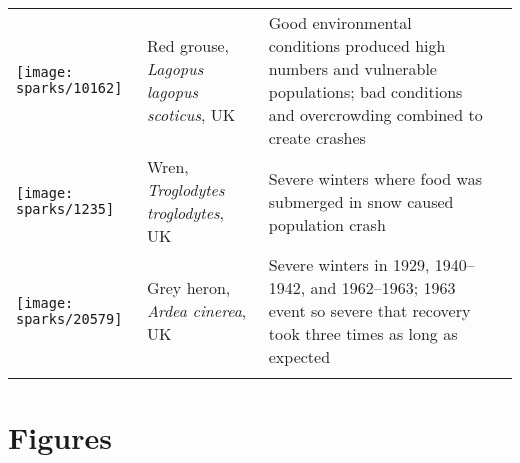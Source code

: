 \documentclass[11pt]{article}
\begin{document}
\begin{small}
\begin{longtable}{>{\RaggedRight}m{2.0cm}>{\RaggedRight}p{3.0cm}>{\RaggedRight}p{7.0cm}>{\RaggedRight}p{2.0cm}}
\texttt{[image: sparks/10162]} &
Red grouse,
\textit{Lagopus lagopus scoticus},
UK &
Good environmental conditions produced high numbers and vulnerable populations; bad conditions and overcrowding combined to create crashes  &
\citep{mackenzie1952}\\

\texttt{[image: sparks/1235]} &
Wren,
\textit{Troglodytes troglodytes},
UK &
Severe winters where food was submerged in snow caused population crash &
\citep{newton1998} \\

\texttt{[image: sparks/20579]} &
Grey heron,
\textit{Ardea cinerea},
UK &
Severe winters in 1929, 1940--1942, and 1962--1963; 1963 event so severe that recovery took three times as long as expected &
\citep{stafford1971} \\





\bottomrule
\label{tab:sparks}
\end{longtable}
\end{small}


\clearpage

\section{Figures}
\end{document}
